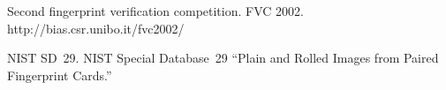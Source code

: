 \begin{multicols}{2}
{{\begin{thebibliography}{99}
Second fingerprint verification competition. FVC 2002. {\sf http://bias.csr.unibo.it/fvc2002/ }

\label{end\stat}

NIST SD~29. NIST Special Database~29 ``Plain and Rolled Images from Paired Fingerprint Cards.''

 \end{thebibliography}
}
}

\end{multicols} 
 
 
 